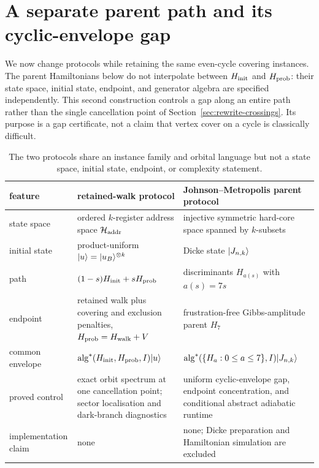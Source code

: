 
\section{A separate parent path and its cyclic-envelope gap}
\label{sec:analytic-family}

We now change protocols while retaining the same even-cycle covering
instances.  The parent Hamiltonians below do not interpolate between
$H_{\rm init}$ and $H_{\rm prob}$: their state space, initial state,
endpoint, and generator algebra are specified independently.  This second
construction controls a gap along an entire path rather than the single
cancellation point of Section~\ref{sec:rewrite-crossings}.  Its purpose is a
gap certificate, not a claim that vertex cover on a cycle is classically
difficult.

\begin{table}[t]
\centering
\caption{The two protocols share an instance family and orbital language but
not a state space, initial state, endpoint, or complexity statement.}
\label{tab:protocol-comparison}
\small
\setlength{\tabcolsep}{6pt}
\begin{tabular}{p{}p{}p{}}
\hline
feature & retained-walk protocol & Johnson--Metropolis parent protocol\\
\hline
state space & ordered $k$-register address space
$\mathcal H_{\rm addr}$ & injective symmetric hard-core space spanned by
$k$-subsets\\
initial state & product-uniform $\lvert u\rangle=\lvert u_B\rangle^{\otimes k}$ & Dicke state
$\lvert J_{n,k}\rangle$\\
path & $(1-s)H_{\rm init}+sH_{\rm prob}$ & discriminants $H_{a(s)}$ with
$a(s)=7s$\\
endpoint & retained walk plus covering and exclusion penalties,
$H_{\rm prob}=H_{\rm walk}+V$ & frustration-free Gibbs-amplitude parent
$H_7$\\
common envelope & $\operatorname{alg}^*(H_{\rm init},H_{\rm prob},I)\lvert u\rangle$
& $\operatorname{alg}^*(\{H_a:0\leq a\leq7\},I)\lvert J_{n,k}\rangle$\\
proved control & exact orbit spectrum at one cancellation point; sector
localisation and dark-branch diagnostics & uniform cyclic-envelope gap,
endpoint concentration, and conditional abstract adiabatic runtime\\
implementation claim & none & none; Dicke preparation and Hamiltonian
simulation are excluded\\
\hline
\end{tabular}
\end{table}

